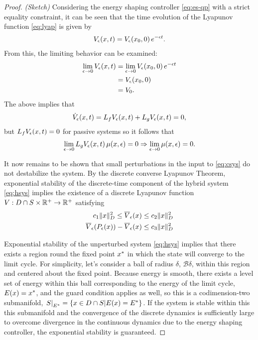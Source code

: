 \begin{proof}
  {\em (Sketch)} Considering the energy shaping controller \eqref{eq:es-qp} with a strict equality constraint, it can be seen that the time evolution of the Lyapunov function \eqref{eq:lyap} is given by
  \begin{align*}
    V_{\epsilon}(x, t) = V_{\epsilon}(x_{0}, 0) \, e^{-\epsilon t}.
  \end{align*}
  From this, the limiting behavior can be examined:
  \begin{align*}
    \lim_{\epsilon \to 0} V_{\epsilon}(x, t) &= \lim_{\epsilon \to 0} V_{\epsilon}(x_{0}, 0) \, e^{-\epsilon t}\\
    &= V_{\epsilon}(x_{0}, 0)\\
    &= V_0.
  \end{align*}
  The above implies that
  \begin{align*}
    {\dot V}_{\epsilon}(x, t) = L_{f} V_{\epsilon}(x, t) + L_{g} V_{\epsilon}(x, t) = 0,
  \end{align*}
  but $L_{f} V_{\epsilon}(x, t) = 0$ for passive systems so it follows that
  \begin{align*}
    \lim_{\epsilon \to 0} L_{g} V_{\epsilon}(x, t) \, \mu(x, \epsilon) = 0 \Rightarrow \lim_{\epsilon \to 0} \mu(x, \epsilon) = 0.
  \end{align*}

  It now remains to be shown that small perturbations in the input to \eqref{eq:csys} do not destabilize the system.
  By the discrete converse Lyapunov Theorem, exponential stability of the discrete-time component of the hybrid system \eqref{eq:hsys} implies the existence of a discrete Lyapunov function $V : D \cap S \times \mathbb{R}^{+} \to \mathbb{R}^{+}$ satisfying
  \begin{align*}
    c_{1} \| x \|^{2}_{D} \leq \overline{V}_{\epsilon}(x) \leq c_{2} \| x \|_{D}^2\\
    \overline{V}_{\epsilon}(P_{\epsilon}(x)) - \overline{V}_{\epsilon}(x) \leq c_{3} \| x \|^{2}_{D}
  \end{align*}

Exponential stability of the unperturbed system \eqref{eq:hsys} implies that there exists a region round the fixed point $x^{*}$ in which the state will converge to the limit cycle.
%
For simplicity, let's consider a ball of radius $\delta$, $\mathcal{B}\delta$, within this region and centered about the fixed point.
%
Because energy is smooth, there exists a level set of energy within this ball corresponding to the energy of the limit cycle, $E(x) = x^{*}$, and the guard condition applies as well, so this is a codimension-two submanifold, $\left.S\right|_{E^{*}} = \{ x \in D \cap S | E(x) = E^{*} \}$.
%
If the system is stable within this this submanifold and the convergence of the discrete dynamics is sufficiently large to overcome divergence in the continuous dynamics due to the energy shaping controller, the exponential stability is guaranteed.



\end{proof}
